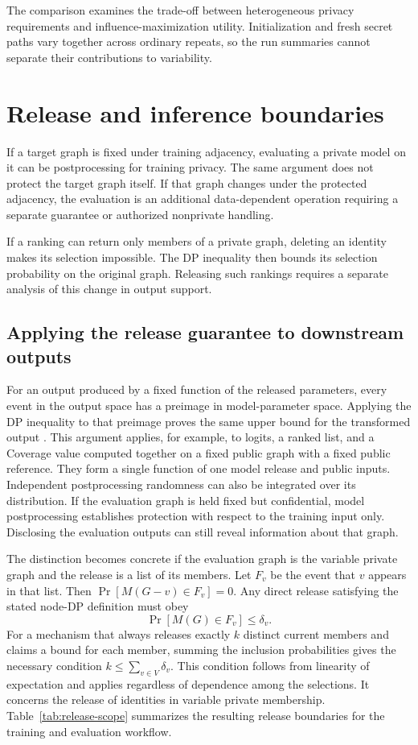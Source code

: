 The comparison examines the trade-off between heterogeneous privacy requirements and influence-maximization utility. Initialization and fresh secret paths vary together across ordinary repeats, so the run summaries cannot separate their contributions to variability.

\section{Release and inference boundaries}
If a target graph is fixed under training adjacency, evaluating a private model on it can be postprocessing for training privacy. The same argument does not protect the target graph itself. If that graph changes under the protected adjacency, the evaluation is an additional data-dependent operation requiring a separate guarantee or authorized nonprivate handling.

If a ranking can return only members of a private graph, deleting an identity makes its selection impossible. The DP inequality then bounds its selection probability on the original graph. Releasing such rankings requires a separate analysis of this change in output support.

\subsection{Applying the release guarantee to downstream outputs}
For an output produced by a fixed function of the released parameters, every event in the output space has a preimage in model-parameter space. Applying the DP inequality to that preimage proves the same upper bound for the transformed output \cite{dwork2014}. This argument applies, for example, to logits, a ranked list, and a Coverage value computed together on a fixed public graph with a fixed public reference. They form a single function of one model release and public inputs. Independent postprocessing randomness can also be integrated over its distribution. If the evaluation graph is held fixed but confidential, model postprocessing establishes protection with respect to the training input only. Disclosing the evaluation outputs can still reveal information about that graph.

The distinction becomes concrete if the evaluation graph is the variable private graph and the release is a list of its members. Let $F_v$ be the event that $v$ appears in that list. Then $\Pr[M(G-v)\in F_v]=0$. Any direct release satisfying the stated node-DP definition must obey
\begin{equation}
 \Pr[M(G)\in F_v]\leq \delta_v.
\end{equation}
For a mechanism that always releases exactly $k$ distinct current members and claims a bound for each member, summing the inclusion probabilities gives the necessary condition $k\leq\sum_{v\in V}\delta_v$. This condition follows from linearity of expectation and applies regardless of dependence among the selections. It concerns the release of identities in variable private membership. Table~\ref{tab:release-scope} summarizes the resulting release boundaries for the training and evaluation workflow.

